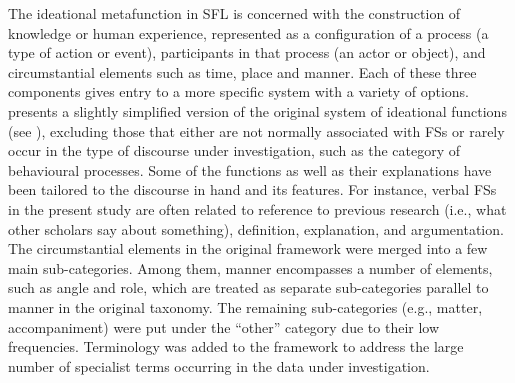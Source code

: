 \documentclass[output=paper]{langscibook}
\begin{document}
The ideational metafunction in SFL is concerned with the construction of knowledge or human experience, represented as a configuration of a process (a type of action or event), participants in that process (an actor or object), and circumstantial elements such as time, place and manner. Each of these three components gives entry to a more specific system with a variety of options.  presents a slightly simplified version of the original system of ideational functions (see \citealt{Halliday2014}), excluding those that either are not normally associated with FSs or rarely occur in the type of discourse under investigation, such as the category of behavioural processes. Some of the functions as well as their explanations have been tailored to the discourse in hand and its features. For instance, verbal FSs in the present study are often related to reference to previous research (i.e., what other scholars say about something), definition, explanation, and argumentation. The circumstantial elements in the original framework were merged into a few main sub-categories. Among them, manner encompasses a number of elements, such as angle and role, which are treated as separate sub-categories parallel to manner in the original taxonomy. The remaining sub-categories (e.g., matter, accompaniment) were put under the ``other'' category due to their low frequencies. Terminology was added to the framework to address the large number of specialist terms occurring in the data under investigation.
\end{document}

